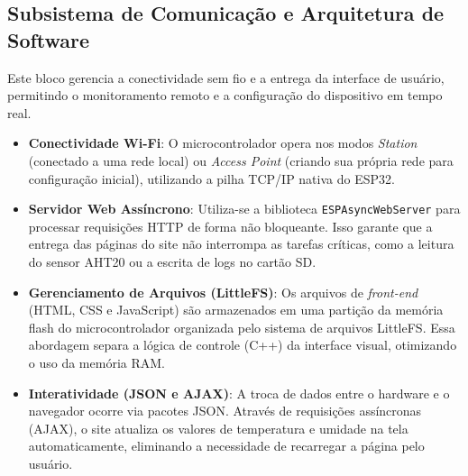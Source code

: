 \subsection{Subsistema de Comunicação e Arquitetura de Software}
Este bloco gerencia a conectividade sem fio e a entrega da interface de usuário, permitindo o monitoramento remoto e a configuração do dispositivo em tempo real.

\begin{itemize}
    \item \textbf{Conectividade Wi-Fi}: O microcontrolador opera nos modos \textit{Station} (conectado a uma rede local) ou \textit{Access Point} (criando sua própria rede para configuração inicial), utilizando a pilha TCP/IP nativa do ESP32.
    \item \textbf{Servidor Web Assíncrono}: Utiliza-se a biblioteca \texttt{ESPAsyncWebServer} para processar requisições HTTP de forma não bloqueante. Isso garante que a entrega das páginas do site não interrompa as tarefas críticas, como a leitura do sensor AHT20 ou a escrita de logs no cartão SD.
    \item \textbf{Gerenciamento de Arquivos (LittleFS)}: Os arquivos de \textit{front-end} (HTML, CSS e JavaScript) são armazenados em uma partição da memória flash do microcontrolador organizada pelo sistema de arquivos LittleFS. Essa abordagem separa a lógica de controle (C++) da interface visual, otimizando o uso da memória RAM.
    \item \textbf{Interatividade (JSON e AJAX)}: A troca de dados entre o hardware e o navegador ocorre via pacotes JSON. Através de requisições assíncronas (AJAX), o site atualiza os valores de temperatura e umidade na tela automaticamente, eliminando a necessidade de recarregar a página pelo usuário.
\end{itemize}